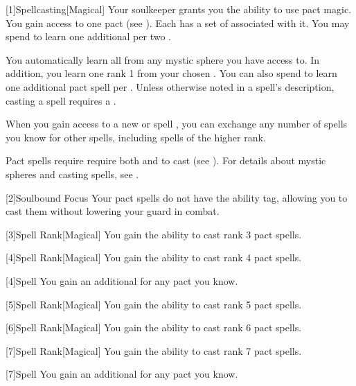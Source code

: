         [1]{Spellcasting}[Magical]
        Your soulkeeper grants you the ability to use pact magic.
        You gain access to one pact  (see ).
        Each  has a set of  associated with it.
        You may spend  to learn one additional  per two .

        You automatically learn all  from any mystic sphere you have access to.
        In addition, you learn one rank 1  from your chosen .
        You can also spend  to learn one additional pact spell per .
        Unless otherwise noted in a spell's description, casting a spell requires a .

        When you gain access to a new  or spell ,
            you can exchange any number of spells you know for other spells,
            including spells of the higher rank.

        Pact spells require require both  and  to cast (see ).
        For details about mystic spheres and casting spells, see .

        [2]{Soulbound Focus} Your pact spells do not have the  ability tag, allowing you to cast them without lowering your guard in combat.

        [3]{Spell Rank}[Magical] You gain the ability to cast rank 3 pact spells.

        [4]{Spell Rank}[Magical] You gain the ability to cast rank 4 pact spells.

        [4]{Spell} You gain an additional  for any pact  you know.

        [5]{Spell Rank}[Magical] You gain the ability to cast rank 5 pact spells.

        [6]{Spell Rank}[Magical] You gain the ability to cast rank 6 pact spells.

        [7]{Spell Rank}[Magical] You gain the ability to cast rank 7 pact spells.

        [7]{Spell} You gain an additional  for any pact  you know.

